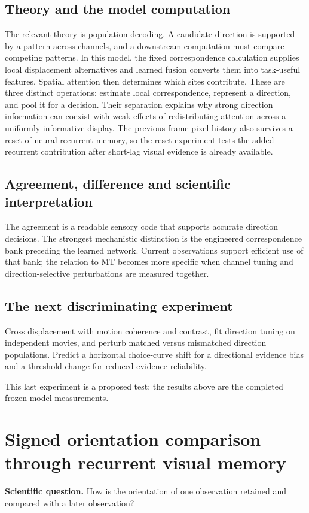 \documentclass[11pt]{article}
\begin{document}
\subsection{Theory and the model computation}
The relevant theory is population decoding. A candidate direction is supported by a pattern across channels, and a downstream computation must compare competing patterns. In this model, the fixed correspondence calculation supplies local displacement alternatives and learned fusion converts them into task-useful features. Spatial attention then determines which sites contribute. These are three distinct operations: estimate local correspondence, represent a direction, and pool it for a decision. Their separation explains why strong direction information can coexist with weak effects of redistributing attention across a uniformly informative display. The previous-frame pixel history also survives a reset of neural recurrent memory, so the reset experiment tests the added recurrent contribution after short-lag visual evidence is already available.

\subsection{Agreement, difference and scientific interpretation}
The agreement is a readable sensory code that supports accurate direction decisions. The strongest mechanistic distinction is the engineered correspondence bank preceding the learned network. Current observations support efficient use of that bank; the relation to MT becomes more specific when channel tuning and direction-selective perturbations are measured together.

\subsection{The next discriminating experiment}
Cross displacement with motion coherence and contrast, fit direction tuning on independent movies, and perturb matched versus mismatched direction populations. Predict a horizontal choice-curve shift for a directional evidence bias and a threshold change for reduced evidence reliability.

This last experiment is a proposed test; the results above are the completed frozen-model measurements.
\clearpage\section{Signed orientation comparison through recurrent visual memory}
\textbf{Scientific question.} How is the orientation of one observation retained and compared with a later observation?
\end{document}
